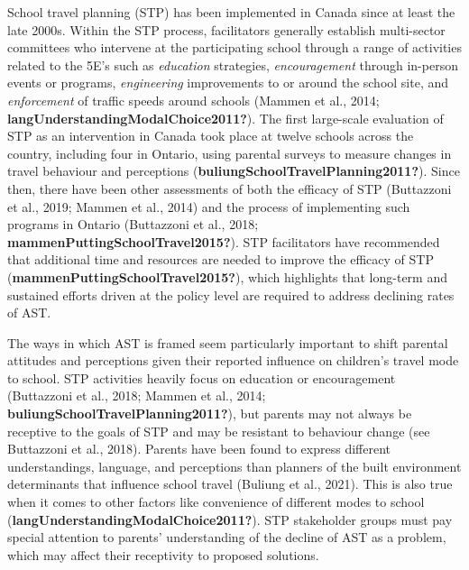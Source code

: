 \documentclass[]{elsarticle} %
\begin{document}
School travel planning (STP) has been implemented in Canada since at
least the late 2000s. Within the STP process, facilitators generally
establish multi-sector committees who intervene at the participating
school through a range of activities related to the 5E's such as
\emph{education} strategies, \emph{encouragement} through in-person
events or programs, \emph{engineering} improvements to or around the
school site, and \emph{enforcement} of traffic speeds around schools
(Mammen et al., 2014; \textbf{langUnderstandingModalChoice2011?}). The
first large-scale evaluation of STP as an intervention in Canada took
place at twelve schools across the country, including four in Ontario,
using parental surveys to measure changes in travel behaviour and
perceptions (\textbf{buliungSchoolTravelPlanning2011?}). Since then,
there have been other assessments of both the efficacy of STP
(Buttazzoni et al., 2019; Mammen et al., 2014) and the process of
implementing such programs in Ontario (Buttazzoni et al., 2018;
\textbf{mammenPuttingSchoolTravel2015?}). STP facilitators have
recommended that additional time and resources are needed to improve the
efficacy of STP (\textbf{mammenPuttingSchoolTravel2015?}), which
highlights that long-term and sustained efforts driven at the policy
level are required to address declining rates of AST.

The ways in which AST is framed seem particularly important to shift
parental attitudes and perceptions given their reported influence on
children's travel mode to school. STP activities heavily focus on
education or encouragement (Buttazzoni et al., 2018; Mammen et al.,
2014; \textbf{buliungSchoolTravelPlanning2011?}), but parents may not
always be receptive to the goals of STP and may be resistant to
behaviour change (see Buttazzoni et al., 2018). Parents have been found
to express different understandings, language, and perceptions than
planners of the built environment determinants that influence school
travel (Buliung et al., 2021). This is also true when it comes to other
factors like convenience of different modes to school
(\textbf{langUnderstandingModalChoice2011?}). STP stakeholder groups
must pay special attention to parents' understanding of the decline of
AST as a problem, which may affect their receptivity to proposed
solutions.
\end{document}
